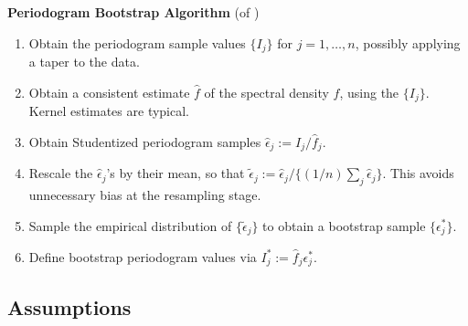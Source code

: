\textbf{Periodogram Bootstrap Algorithm} (of \cite{bootstrap})
\begin{enumerate}
\item Obtain the periodogram sample values $\{I_j\}$ for $j=1,\ldots,n$, possibly applying a taper to the data.
\item Obtain a consistent estimate $\hat f$ of the spectral density $f$, using the $\{I_j\}$. Kernel estimates are typical. 
\item Obtain Studentized periodogram samples $\hat\epsilon_j := I_j / \hat f_j$. 
\item Rescale the $\hat\epsilon_j$'s by their mean, so that $\tilde\epsilon_j := \hat\epsilon_j / \{(1/n) \sum_j \hat\epsilon_j\}$. This avoids unnecessary bias at the resampling stage. 
\item Sample the empirical distribution of $\{\tilde\epsilon_j\}$ to obtain a bootstrap sample $\{\epsilon^*_j\}$. 
\item Define bootstrap periodogram values via $I_j^* := \hat f_j \epsilon^*_j$.
\end{enumerate}

\subsection*{Assumptions}

